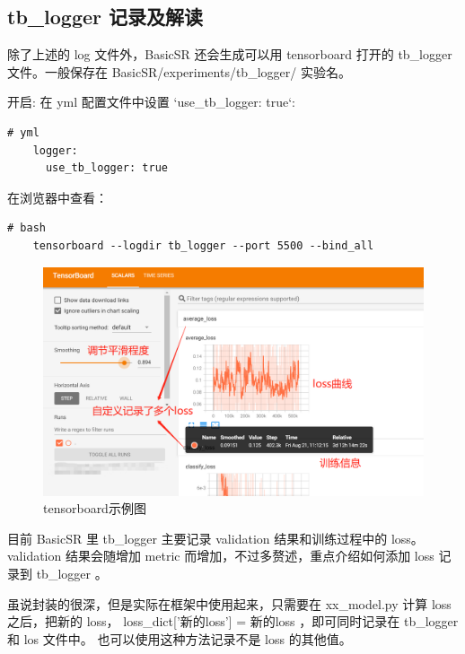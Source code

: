 \documentclass[../main.tex]{subfiles}
\begin{document}
\subsection{tb\_logger 记录及解读}

除了上述的 log 文件外，BasicSR 还会生成可以用 tensorboard 打开的 tb\_logger 文件。一般保存在 BasicSR/experiments/tb\_logger/ 实验名。


开启: 在 yml 配置文件中设置 `use\_tb\_logger: true`:
\begin{verbatim}
# yml
    logger:
      use_tb_logger: true
\end{verbatim}

在浏览器中查看：
\begin{verbatim}
# bash
    tensorboard --logdir tb_logger --port 5500 --bind_all
\end{verbatim}

\begin{figure}[h]
    \begin{center}
        \includegraphics[width=0.8\linewidth]{figures/tensorboard_demo.png}
        \caption{tensorboard示例图}
        \label{fig:tensorboard_demo}
    \end{center}
\end{figure}

目前 BasicSR 里 tb\_logger 主要记录 validation 结果和训练过程中的 loss。validation 结果会随增加 metric 而增加，不过多赘述，重点介绍如何添加 loss 记录到 tb\_logger 。

\begin{hl} %
    虽说封装的很深，但是实际在框架中使用起来，只需要在 xx\_model.py 计算 loss 之后，把新的 loss， loss\_dict['新的loss'] = 新的loss ，即可同时记录在 tb\_logger 和 los 文件中。
    也可以使用这种方法记录不是 loss 的其他值。
\end{hl}
\end{document}
